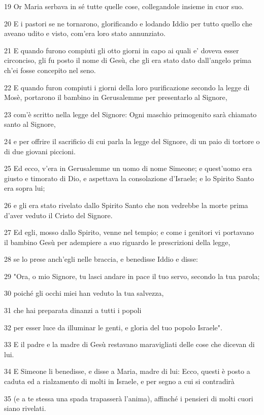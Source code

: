 \par 19 Or Maria serbava in sé tutte quelle cose, collegandole insieme in cuor suo.
\par 20 E i pastori se ne tornarono, glorificando e lodando Iddio per tutto quello che aveano udito e visto, com'era loro stato annunziato.
\par 21 E quando furono compiuti gli otto giorni in capo ai quali e' doveva esser circonciso, gli fu posto il nome di Gesù, che gli era stato dato dall'angelo prima ch'ei fosse concepito nel seno.
\par 22 E quando furon compiuti i giorni della loro purificazione secondo la legge di Mosè, portarono il bambino in Gerusalemme per presentarlo al Signore,
\par 23 com'è scritto nella legge del Signore: Ogni maschio primogenito sarà chiamato santo al Signore,
\par 24 e per offrire il sacrificio di cui parla la legge del Signore, di un paio di tortore o di due giovani piccioni.
\par 25 Ed ecco, v'era in Gerusalemme un uomo di nome Simeone; e quest'uomo era giusto e timorato di Dio, e aspettava la consolazione d'Israele; e lo Spirito Santo era sopra lui;
\par 26 e gli era stato rivelato dallo Spirito Santo che non vedrebbe la morte prima d'aver veduto il Cristo del Signore.
\par 27 Ed egli, mosso dallo Spirito, venne nel tempio; e come i genitori vi portavano il bambino Gesù per adempiere a suo riguardo le prescrizioni della legge,
\par 28 se lo prese anch'egli nelle braccia, e benedisse Iddio e disse:
\par 29 "Ora, o mio Signore, tu lasci andare in pace il tuo servo, secondo la tua parola;
\par 30 poiché gli occhi miei han veduto la tua salvezza,
\par 31 che hai preparata dinanzi a tutti i popoli
\par 32 per esser luce da illuminar le genti, e gloria del tuo popolo Israele".
\par 33 E il padre e la madre di Gesù restavano maravigliati delle cose che dicevan di lui.
\par 34 E Simeone li benedisse, e disse a Maria, madre di lui: Ecco, questi è posto a caduta ed a rialzamento di molti in Israele, e per segno a cui si contradirà
\par 35 (e a te stessa una spada trapasserà l'anima), affinché i pensieri di molti cuori siano rivelati.
